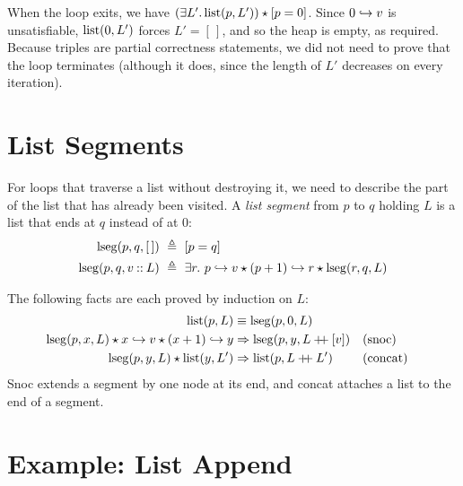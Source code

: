 When the loop exits, we have $(\exists L'.\,\mathrm{list}(p,L'))\mathbin{\star}[p=0]$. Since $0\hookrightarrow v$ is
unsatisfiable, $\mathrm{list}(0,L')$ forces $L'=[\,]$, and so the heap is empty, as required. Because
triples are partial correctness statements, we did not need to prove that the loop terminates
(although it does, since the length of $L'$ decreases on every iteration).

\section{List Segments}

For loops that traverse a list without destroying it, we need to describe the part of the list that
has already been visited. A \emph{list segment} from $p$ to $q$ holding $L$ is a list that ends at
$q$ instead of at $0$:
\begin{align*}
  \mathrm{lseg}(p,q,[\,])&\ \triangleq\ [p=q]\\
  \mathrm{lseg}(p,q,v\mathbin{::} L)&\ \triangleq\ \exists r.\ p\hookrightarrow v\mathbin{\star}(p+1)\hookrightarrow r\mathbin{\star}\mathrm{lseg}(r,q,L)
\end{align*}

\begin{center}
\end{center}

The following facts are each proved by induction on $L$:
\begin{align*}
  \mathrm{list}(p,L)&\equiv\mathrm{lseg}(p,0,L)\\
  \mathrm{lseg}(p,x,L)\mathbin{\star} x\hookrightarrow v\mathbin{\star}(x+1)\hookrightarrow y&\Rightarrow\mathrm{lseg}(p,y,L\mathbin{+\!\!+}[v]) && \text{(snoc)}\\
  \mathrm{lseg}(p,y,L)\mathbin{\star}\mathrm{list}(y,L')&\Rightarrow\mathrm{list}(p,L\mathbin{+\!\!+} L') && \text{(concat)}
\end{align*}
Snoc extends a segment by one node at its end, and concat attaches a list to the end of a segment.

\section{Example: List Append}

